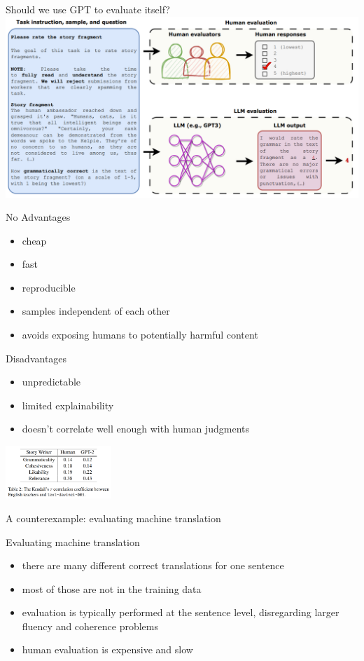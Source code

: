 \begin{vbframe}{Should we use GPT to evaluate itself?}
	\vfill
	\includegraphics[width=\textwidth]{evaluation_figures/gpt_self_eval.png}
	\vfill
\end{vbframe}

\begin{vbframe}{No}
	Advantages
	\begin{itemize}
	\item cheap
	\item fast
	\item reproducible
	\item samples independent of each other
	\item avoids exposing humans to potentially harmful content
	\end{itemize}
	\vfill
	Disadvantages
	\begin{itemize}
	\item unpredictable
	\item limited explainability
	\item doesn't correlate well enough with human judgments
	\end{itemize}
	\includegraphics[width=0.3\textwidth]{evaluation_figures/bad_correlation.png}

\end{vbframe}

\begin{vbframe}{A counterexample: evaluating machine translation}
\end{vbframe}

\begin{vbframe}{Evaluating machine translation}
	\vfill
	\begin{itemize}
		\item there are many different correct translations for one sentence
		\item most of those are not in the training data
		\item evaluation is typically performed at the sentence level, disregarding larger fluency and coherence problems
		\item human evaluation is expensive and slow
	\end{itemize}
	\vfill
\end{vbframe}

